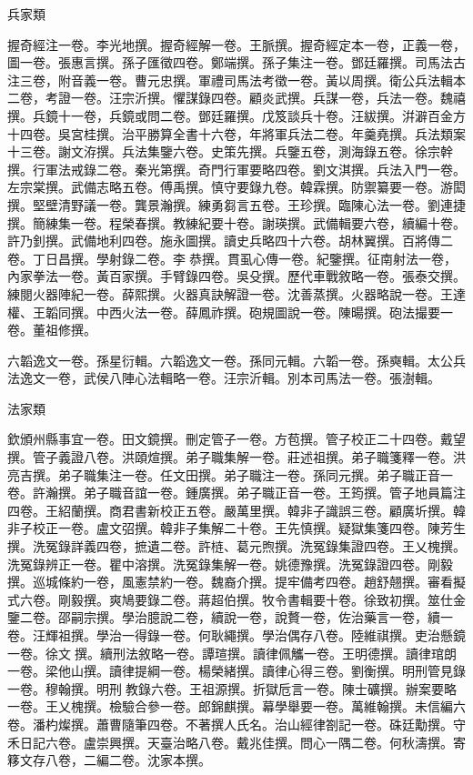 \begin{pinyinscope}
兵家類

握奇經注一卷。李光地撰。握奇經解一卷。王脈撰。握奇經定本一卷，正義一卷，圖一卷。張惠言撰。孫子匯徵四卷。鄭端撰。孫子集注一卷。鄧廷羅撰。司馬法古注三卷，附音義一卷。曹元忠撰。軍禮司馬法考徵一卷。黃以周撰。衛公兵法輯本二卷，考證一卷。汪宗沂撰。懼謀錄四卷。顧炎武撰。兵謀一卷，兵法一卷。魏禧撰。兵鏡十一卷，兵鏡或問二卷。鄧廷羅撰。戊笈談兵十卷。汪紱撰。洴澼百金方十四卷。吳宮桂撰。治平勝算全書十六卷，年將軍兵法二卷。年羹堯撰。兵法類案十三卷。謝文洊撰。兵法集鑒六卷。史策先撰。兵鑒五卷，測海錄五卷。徐宗幹撰。行軍法戒錄二卷。秦光第撰。奇門行軍要略四卷。劉文淇撰。兵法入門一卷。左宗棠撰。武備志略五卷。傅禹撰。慎守要錄九卷。韓霖撰。防禦纂要一卷。游閎撰。堅壁清野議一卷。龔景瀚撰。練勇芻言五卷。王珍撰。臨陳心法一卷。劉連捷撰。簡練集一卷。程榮春撰。教練紀要十卷。謝瑛撰。武備輯要六卷，續編十卷。許乃釗撰。武備地利四卷。施永圖撰。讀史兵略四十六卷。胡林翼撰。百將傳二卷。丁日昌撰。學射錄二卷。李恭撰。貫虱心傳一卷。紀鑒撰。征南射法一卷，內家拳法一卷。黃百家撰。手臂錄四卷。吳殳撰。歷代車戰敘略一卷。張泰交撰。練閱火器陣紀一卷。薛熙撰。火器真訣解證一卷。沈善蒸撰。火器略說一卷。王達權、王韜同撰。中西火法一卷。薛鳳祚撰。砲規圖說一卷。陳暘撰。砲法撮要一卷。董祖修撰。

六韜逸文一卷。孫星衍輯。六韜逸文一卷。孫同元輯。六韜一卷。孫奭輯。太公兵法逸文一卷，武侯八陣心法輯略一卷。汪宗沂輯。別本司馬法一卷。張澍輯。

法家類

欽頒州縣事宜一卷。田文鏡撰。刪定管子一卷。方苞撰。管子校正二十四卷。戴望撰。管子義證八卷。洪頤煊撰。弟子職集解一卷。莊述祖撰。弟子職箋釋一卷。洪亮吉撰。弟子職集注一卷。任文田撰。弟子職注一卷。孫同元撰。弟子職正音一卷。許瀚撰。弟子職音誼一卷。鍾廣撰。弟子職正音一卷。王筠撰。管子地員篇注四卷。王紹蘭撰。商君書新校正五卷。嚴萬里撰。韓非子識誤三卷。顧廣圻撰。韓非子校正一卷。盧文弨撰。韓非子集解二十卷。王先慎撰。疑獄集箋四卷。陳芳生撰。洗冤錄詳義四卷，摭遺二卷。許梿、葛元煦撰。洗冤錄集證四卷。王乂槐撰。洗冤錄辨正一卷。瞿中溶撰。洗冤錄集解一卷。姚德豫撰。洗冤錄證四卷。剛毅撰。巡城條約一卷，風憲禁約一卷。魏裔介撰。提牢備考四卷。趙舒翹撰。審看擬式六卷。剛毅撰。爽鳩要錄二卷。蔣超伯撰。牧令書輯要十卷。徐致初撰。筮仕金鑒二卷。邵嗣宗撰。學治臆說二卷，續說一卷，說贅一卷，佐治藥言一卷，續一卷。汪輝祖撰。學治一得錄一卷。何耿繩撰。學治偶存八卷。陸維祺撰。吏治懸鏡一卷。徐文撰。續刑法敘略一卷。譚瑄撰。讀律佩觿一卷。王明德撰。讀律琯朗一卷。梁他山撰。讀律提綱一卷。楊榮緒撰。讀律心得三卷。劉衡撰。明刑管見錄一卷。穆翰撰。明刑教錄六卷。王祖源撰。折獄卮言一卷。陳士礦撰。辦案要略一卷。王乂槐撰。檢驗合參一卷。郎錦麒撰。幕學舉要一卷。萬維翰撰。未信編六卷。潘杓燦撰。蕭曹隨筆四卷。不著撰人氏名。治山經律劄記一卷。硃廷勱撰。守禾日記六卷。盧崇興撰。天臺治略八卷。戴兆佳撰。問心一隅二卷。何秋濤撰。寄簃文存八卷，二編二卷。沈家本撰。


\end{pinyinscope}
